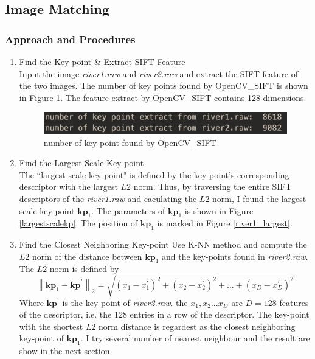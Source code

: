\documentclass[11pt]{article}
\newcommand{\vct}[1]{\bm{#1}}
\begin{document}
\subsection{Image Matching}

\subsubsection{Approach and Procedures}
\begin{enumerate}
\item Find the Key-point \& Extract SIFT Feature \\
Input the image {\it river1.raw} and {\it river2.raw} and extract the SIFT feature of the two images. The number of key points found by OpenCV\_SIFT is shown in Figure \ref{numofkey}. The feature extract by OpenCV\_SIFT contains 128 dimensions. 
\begin{figure}[!htp]
	\centering
	\includegraphics[scale=0.4]{numofkey.png}
	\caption{number of key point found by OpenCV\_SIFT}
	\label{numofkey}
	\end{figure}
\item Find the Largest Scale Key-point\\
The ``largest scale key point" is defined by the key point's corresponding descriptor with the largest $L2$ norm. Thus, by traversing the entire SIFT descriptors of the {\it river1.raw} and caculating the $L2$ norm, I found the largest scale key point $\vct {kp}_1$. The parameters of $\vct {kp}_1$ is shown in Figure \ref{largestscalekp}. The position of $\vct {kp}_1$ is marked in Figure \ref{river1_largest}.


\item Find the Closest Neighboring Key-point
Use K-NN method and compute the $L2$ norm of the distance between $\vct {kp}_1$ and the key-points found in {\it river2.raw}. The $L2$ norm is defined by 
\begin{equation}
\left\| \vct {kp}_{ 1 }-\vct {kp}^{ ' } \right\|_{2} =\sqrt { (x_{ 1 }-{ x }_{ 1 }^{ ' })^{ 2 } + (x_{ 2 }-{ x }_{ 2 }^{ ' })^{ 2 } +...+(x_{ D }-{ x }_{ D }^{ ' })^{ 2 }}
\end{equation}
Where $\vct {kp}^{ ' }$ is the key-point of {\it river2.raw}. the $x_1,x_2...x_D$ are $D = 128$ features of the descriptor, i.e. the 128 entries in a row of the descriptor.
The key-point with the shortest $L2$ norm distance is regardest as the closest neighboring key-point of $\vct {kp}_1$. 
I try several number of nearest neighbour and the result are show in the next section.

\end{enumerate} 
\end{document}
